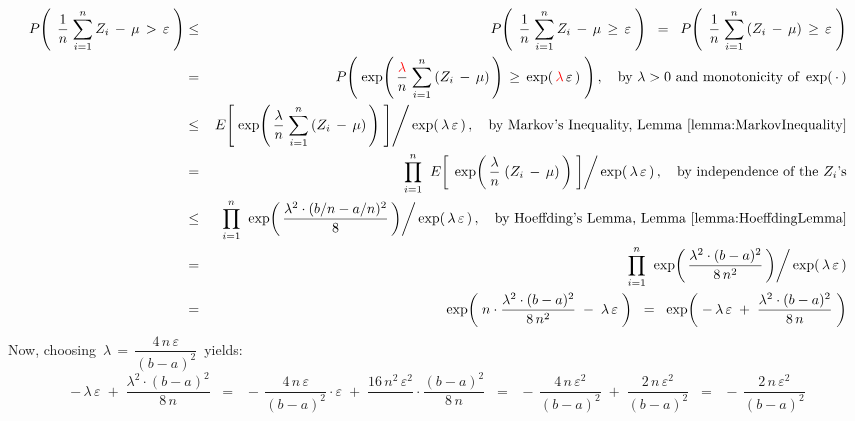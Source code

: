 \begin{eqnarray*}
P\!\left(\;\,
	\dfrac{1}{n}\;\overset{n}{\underset{i=1}{\sum}}\,Z_{i} \, - \, \mu
	\,>\,\varepsilon
	\;\right)
& \leq &
	P\!\left(\;\,
		\dfrac{1}{n}\;\overset{n}{\underset{i=1}{\sum}}\,Z_{i} \, - \, \mu
		\,\geq\,\varepsilon
		\;\right)
\;\; = \;\;
	P\!\left(\;\,
		\dfrac{1}{n}\;\overset{n}{\underset{i=1}{\sum}}\,(Z_{i} \, - \, \mu)
		\,\geq\,\varepsilon
		\;\right)
\\
& = &
	P\!\left(\;
		\exp\!\left(\,\dfrac{{\color{red}\lambda}}{n}\;\overset{n}{\underset{i=1}{\sum}}\,(Z_{i} \, - \, \mu)\,\right)
		\,\geq\, \exp(\,{\color{red}\lambda}\,\varepsilon\,)
		\;\right),
	\quad
	\textnormal{by $\lambda > 0$ and monotonicity of \,$\exp(\,\cdot\,)$}
\\
& \leq &
	\left.E\!\left[\;
		\exp\!\left(\,\dfrac{\lambda}{n}\;\overset{n}{\underset{i=1}{\sum}}\,(Z_{i} \, - \, \mu)\,\right)
		\;\right]
		\right\slash \exp(\,\lambda\,\varepsilon\,)\,,
	\quad
	\textnormal{by Markov's Inequality, Lemma \ref{lemma:MarkovInequality}}
\\
& = &
	\overset{n}{\underset{i=1}{\prod}}\;
	\left.E\!\left[\;\,
		\exp\!\left(\,\dfrac{\lambda}{n}\;(Z_{i} \, - \, \mu)\,\right)
		\;\right]
		\right\slash \exp(\,\lambda\,\varepsilon\,)\,,
	\quad
	\textnormal{by independence of the $Z_{i}$'s}
\\
& \leq &
	\overset{n}{\underset{i=1}{\prod}}\;
	\left.\exp\!\left(\,\dfrac{\lambda^{2}\cdot(b/n-a/n)^{2}}{8}\,\right)
		\right\slash \exp(\,\lambda\,\varepsilon\,)\,,
	\quad
	\textnormal{by Hoeffding's Lemma, Lemma \ref{lemma:HoeffdingLemma}}
\\
& = &
	\overset{n}{\underset{i=1}{\prod}}\;
	\left.\exp\!\left(\,\dfrac{\lambda^{2}\cdot(b-a)^{2}}{8\,n^{2}}\,\right)
		\right\slash \exp(\,\lambda\,\varepsilon\,)
\\
& = &
	\exp\!\left(\;
		n\cdot\dfrac{\lambda^{2}\cdot(b-a)^{2}}{8\,n^{2}}
		\; - \;
		\lambda\,\varepsilon
		\;\right)
\;\; = \;\;
	\exp\!\left(\;
		- \, \lambda\,\varepsilon
		\; + \;
		\dfrac{\lambda^{2}\cdot(b-a)^{2}}{8\,n}
		\;\right)
\end{eqnarray*}
Now, choosing \,$\lambda \,=\, \dfrac{4\,n\,\varepsilon}{(b-a)^{2}}$\, yields:
\begin{equation*}
- \, \lambda\,\varepsilon \; + \; \dfrac{\lambda^{2}\cdot(b-a)^{2}}{8\,n}
\;\; = \;\;
	- \, \dfrac{4\,n\,\varepsilon}{(b-a)^{2}}\cdot\varepsilon
	\; + \;
	\dfrac{16\,n^{2}\,\varepsilon^{2}}{}\cdot\dfrac{(b-a)^{2}}{8\,n}
\;\; = \;\;
	- \, \dfrac{4\,n\,\varepsilon^{2}}{(b-a)^{2}}
	\; + \; \dfrac{2\,n\,\varepsilon^{2}}{(b-a)^{2}}
\;\; = \;\;
	- \, \dfrac{2\,n\,\varepsilon^{2}}{(b-a)^{2}}
\end{equation*}
